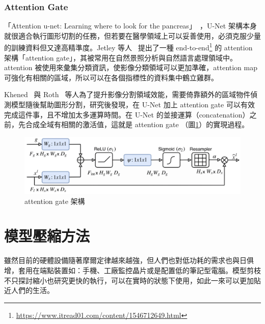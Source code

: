 \subsubsection{Attention Gate}
「Attention u-net: Learning where to look for the pancreas」~\cite{oktay2018attention}，U-Net 架構本身就很適合執行圖形切割的任務，但若要在醫學領域上可以妥善使用，必須克服少量的訓練資料但又達高精準度。Jetley 等人~\cite{jetley2018learn} 提出了一種 end-to-end\footnote{\url{https://www.itread01.com/content/1546712649.html}} 的 attention 架構「attention gate」，其被常用在自然景照分析與自然語言處理領域中。attention 被使用來彙集分類資訊，使影像分類領域可以更加準確，attention map 可強化有相關的區域，所以可以在各個指標性的資料集中鶴立雞群。

Khened~\cite{khened2019fully} 與 Roth~\cite{roth2018spatial} 等人為了提升影像分割領域效能，需要倚靠額外的區域物件偵測模型隨後幫助圖形分割，研究後發現，在 U-Net 加上 attention gate 可以有效完成這件事，且不增加太多運算時間。在 U-Net 的並接運算（concatenation）之前，先合成全域有相關的激活值，這就是 attention gate （圖\ref{attention_gate1}）的實現過程。
\begin{figure}[htbp]
    \hfil
    \begin{minipage}[t]{0.8\textwidth}
        \includegraphics[width=\textwidth]{./figures/chapter02_method/attention_gate1.png}
        \caption {attention gate 架構}
        \label{attention_gate1}
    \end{minipage}
    \hfil
\end{figure}


\section{模型壓縮方法}
雖然目前的硬體設備隨著摩爾定律越來越強，但人們也對低功耗的需求也與日俱增，套用在端點裝置如：手機、工廠監控晶片或是配置低的筆記型電腦。模型剪枝不只探討縮小也研究更快的執行，可以在實時的狀態下使用，如此一來可以更加貼近人們的生活。


